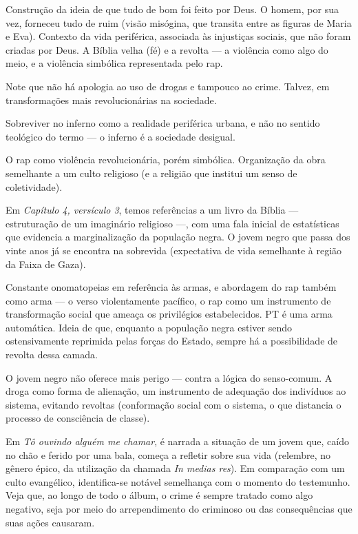 Construção da ideia de que tudo de bom foi feito por Deus. O homem, por sua vez, forneceu tudo de ruim (visão misógina, que transita entre as figuras de Maria e Eva). Contexto da vida periférica, associada às injustiças sociais, que não foram criadas por Deus. A Bíblia velha (fé) e a revolta — a violência como algo do meio, e a violência simbólica representada pelo rap.

Note que não há apologia ao uso de drogas e tampouco ao crime. Talvez, em transformações mais revolucionárias na sociedade.

Sobreviver no inferno como a realidade periférica urbana, e não no sentido teológico do termo — o inferno é a sociedade desigual.

O rap como violência revolucionária, porém simbólica. Organização da obra semelhante a um culto religioso (e a religião que institui um senso de coletividade).

Em \textit{Capítulo 4, versículo 3}, temos referências a um livro da Bíblia — estruturação de um imaginário religioso —, com uma fala inicial de estatísticas que evidencia a marginalização da população negra. O jovem negro que passa dos vinte anos já se encontra na sobrevida (expectativa de vida semelhante à região da Faixa de Gaza).

Constante onomatopeias em referência às armas, e abordagem do rap também como arma — o verso violentamente pacífico, o rap como um instrumento de transformação social que ameaça os privilégios estabelecidos. PT é uma arma automática. Ideia de que, enquanto a população negra estiver sendo ostensivamente reprimida pelas forças do Estado, sempre há a possibilidade de revolta dessa camada.

O jovem negro não oferece mais perigo — contra a lógica do senso-comum. A droga como forma de alienação, um instrumento de adequação dos indivíduos ao sistema, evitando revoltas (conformação social com o sistema, o que distancia o processo de consciência de classe).

Em \textit{Tô ouvindo alguém me chamar}, é narrada a situação de um jovem que, caído no chão e ferido por uma bala, começa a refletir sobre sua vida (relembre, no gênero épico, da utilização da chamada \textit{In medias res}). Em comparação com um culto evangélico, identifica-se notável semelhança com o momento do testemunho. Veja que, ao longo de todo o álbum, o crime é sempre tratado como algo negativo, seja por meio do arrependimento do criminoso ou das consequências que suas ações causaram.

